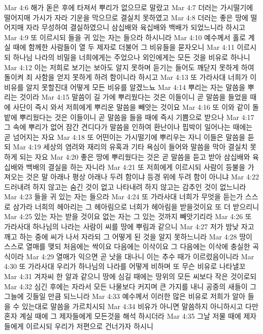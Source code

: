 Mar 4:6  해가 돋은 후에 타져서 뿌리가 없으므로 말랐고
Mar 4:7  더러는 가시떨기에 떨어지매 가시가 자라 기운을 막으므로 결실치 못하였고
Mar 4:8  더러는 좋은 땅에 떨어지매 자라 무성하여 결실하였으니 삼십배와 육십배와 백배가 되었느니라 하시고
Mar 4:9  또 이르시되 들을 귀 있는 자는 들으라 하시니라
Mar 4:10  예수께서 홀로 계실 때에 함께한 사람들이 열 두 제자로 더불어 그 비유들을 묻자오니
Mar 4:11  이르시되 하나님 나라의 비밀을 너희에게는 주었으나 외인에게는 모든 것을 비유로 하나니
Mar 4:12  이는 저희로 보기는 보아도 알지 못하며 듣기는 들어도 깨닫지 못하게 하여 돌이켜 죄 사함을 얻지 못하게 하려 함이니라 하시고
Mar 4:13  또 가라사대 너희가 이 비유를 알지 못할진대 어떻게 모든 비유를 알겠느뇨
Mar 4:14  뿌리는 자는 말씀을 뿌리는 것이라
Mar 4:15  말씀이 길 가에 뿌리웠다는 것은 이들이니 곧 말씀을 들었을 때에 사단이 즉시 와서 저희에게 뿌리운 말씀을 빼앗는 것이요
Mar 4:16  또 이와 같이 돌밭에 뿌리웠다는 것은 이들이니 곧 말씀을 들을 때에 즉시 기쁨으로 받으나
Mar 4:17  그 속에 뿌리가 없어 잠간 견디다가 말씀을 인하여 환난이나 핍박이 일어나는 때에는 곧 넘어지는 자요
Mar 4:18  또 어떤이는 가시떨기에 뿌리우는 자니 이들은 말씀을 듣되
Mar 4:19  세상의 염려와 재리의 유혹과 기타 욕심이 들어와 말씀을 막아 결실치 못하게 되는 자요
Mar 4:20  좋은 땅에 뿌리웠다는 것은 곧 말씀을 듣고 받아 삼십배와 육십배와 백배의 결실을 하는 자니라
Mar 4:21  또 저희에게 이르시되 사람이 등불을 가져오는 것은 말 아래나 평상 아래나 두려 함이냐 등경 위에 두려 함이 아니냐
Mar 4:22  드러내려 하지 않고는 숨긴 것이 없고 나타내려 하지 않고는 감추인 것이 없느니라
Mar 4:23  들을 귀 있는 자는 들으라
Mar 4:24  또 가라사대 너희가 무엇을 듣는가 스스로 삼가라 너희의 헤아리는 그 헤아림으로 너희가 헤아림을 받을것이요 또 더 받으리니
Mar 4:25  있는 자는 받을 것이요 없는 자는 그 있는 것까지 빼앗기리라
Mar 4:26  또 가라사대 하나님의 나라는 사람이 씨를 땅에 뿌림과 같으니
Mar 4:27  저가 밤낮 자고 깨고 하는 중에 씨가 나서 자라되 그 어떻게 된 것을 알지 못하느니라
Mar 4:28  땅이 스스로 열매를 맺되 처음에는 싹이요 다음에는 이삭이요 그 다음에는 이삭에 충실한 곡식이라
Mar 4:29  열매가 익으면 곧 낫을 대나니 이는 추수 때가 이르렀음이니라
Mar 4:30  또 가라사대 우리가 하나님의 나라를 어떻게 비하며 또 무슨 비유로 나타낼꼬
Mar 4:31  겨자씨 한 알과 같으니 땅에 심길 때에는 땅위의 모든 씨보다 작은 것이로되
Mar 4:32  심긴 후에는 자라서 모든 나물보다 커지며 큰 가지를 내니 공중의 새들이 그 그늘에 깃들일 만큼 되느니라
Mar 4:33  예수께서 이러한 많은 비유로 저희가 알아 들을 수 있는대로 말씀을 가르치시되
Mar 4:34  비유가 아니면 말씀하지 아니하시고 다만 혼자 계실 때에 그 제자들에게 모든것을 해석 하시더라
Mar 4:35  그날 저물 때에 제자들에게 이르시되 우리가 저편으로 건너가자 하시니

